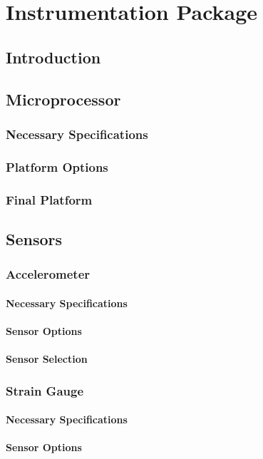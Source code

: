 \documentclass[12pt]{report}
\begin{document}
\chapter{Instrumentation Package}
	\section{Introduction}
	\section{Microprocessor}
		\subsection{Necessary Specifications}
		\subsection{Platform Options}
		\subsection{Final Platform}
	\section{Sensors}
		\subsection{Accelerometer}
			\subsubsection{Necessary Specifications}
			\subsubsection{Sensor Options}
			\subsubsection{Sensor Selection}
		\subsection{Strain Gauge}
			\subsubsection{Necessary Specifications}
			\subsubsection{Sensor Options}
\end{document}
